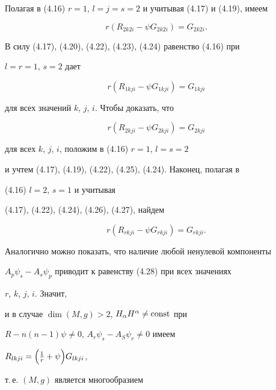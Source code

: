 Полагая в (4.16) $r=1$, $l=j=s=2$ и учитывая (4.17) и (4.19), имеем


\begin{equation}


r(R_{2k2i}-\psi G_{2k2i})=G_{2k2i}.\tag{4.25}


\end{equation}


В силу (4.17), (4.20), (4.22), (4.23), (4.24) равенство (4.16) при


$l=r=1$, $s=2$ дает


\begin{equation}


r(R_{1kji}-\psi G_{1kji})=G_{1kji}\tag{4.26}


\end{equation}


для всех значений $k$, $j$, $i$. Чтобы доказать, что


\begin{equation}


r(R_{2kji}-\psi G_{2kji})=G_{2kji} \tag{4.27}


\end{equation}


для всех $k$, $j$, $i$, положим в (4.16) $r=1$, $l=s=2$


и учтем (4.17), (4.19), (4.22), (4.25), (4.24). Наконец, полагая в


(4.16) $l=2$, $s=1$ и учитывая


(4.17), (4.22), (4.24), (4.26), (4.27), найдем


\begin{equation}


r(R_{rkji}-\psi G_{rkji})=G_{rkji}.\tag{4.28}


\end{equation}





Аналогично можно показать, что наличие любой ненулевой компоненты


$A_p\psi_s-A_s\psi_p$ приводит к равенству (4.28) при всех значениях


$r$, $k$, $j$, $i$. Значит,


и в случае $\dim(M,g)>2$, $H_\alpha H^\alpha\ne \operatorname{const}$ при


$R-n(n-1)\psi\ne 0$, $A_r\psi_s-A_S\psi_r\ne 0$ имеем


$R_{lkji}=\Bigl(\frac{1}{r}+\psi\Bigr)G_{lkji}$,


т.\,е. $(M,g)$ является многообразием


